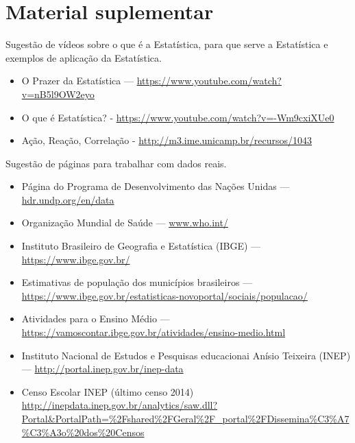 {\begin{project}
\begin{enumerate}
\end{enumerate}
\end{project}

\section{Material suplementar}
\label{est1-suplementar-1}

Sugestão de vídeos sobre o que é a Estatística, para que serve a Estatística e exemplos de aplicação da Estatística.
\begin{itemize}
\item {} 
O Prazer da Estatística --- \url{https://www.youtube.com/watch?v=nB5l9OW2eyo}

\item {} 
O que é Estatística? - \url{https://www.youtube.com/watch?v=-Wm9cxiXUe0}

\item {} 
Ação, Reação, Correlação - \url{http://m3.ime.unicamp.br/recursos/1043}

\end{itemize}

Sugestão de páginas para trabalhar com dados reais.
\begin{itemize}
\item {} 
Página do Programa de Desenvolvimento das Nações Unidas --- \url{hdr.undp.org/en/data}

\item {} 
Organização Mundial de Saúde --- \url{www.who.int/}

\item {} 
Instituto Brasileiro de Geografia e Estatística (IBGE) --- \url{https://www.ibge.gov.br/}

\item {} 
Estimativas de população dos municípios brasileiros --- \url{https://www.ibge.gov.br/estatisticas-novoportal/sociais/populacao/}

\item {} 
Atividades para o Ensino Médio --- \url{https://vamoscontar.ibge.gov.br/atividades/ensino-medio.html}


\item {} 
Instituto Nacional de Estudos e Pesquisas educacionai Anísio Teixeira (INEP) --- \url{http://portal.inep.gov.br/inep-data}


\item {} 
Censo Escolar INEP (último censo 2014) \textendash{} \url{http://inepdata.inep.gov.br/analytics/saw.dll?Portal\&PortalPath=\%2Fshared\%2FGeral\%2F\_portal\%2FDissemina\%C3\%A7\%C3\%A3o\%20dos\%20Censos}


\end{itemize}}
